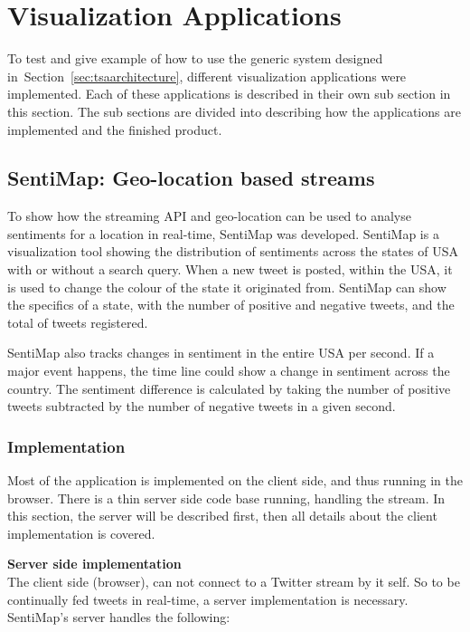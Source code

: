 \clearpage
\section{Visualization Applications}
\label{sec:visualization_applications}
To test and give example of how to use the generic system designed in~Section~\ref{sec:tsaarchitecture}, different visualization applications were implemented. Each of these applications is described in their own sub section in this section. The sub sections are divided into describing how the applications are implemented and the finished product.

\subsection{SentiMap: Geo-location based streams}

To show how the streaming API and geo-location can be used to analyse sentiments for a location in real-time, SentiMap was developed. SentiMap is a visualization tool showing the distribution of sentiments across the states of USA with or without a search query. When a new tweet is posted, within the USA, it is used to change the colour of the state it originated from. SentiMap can show the specifics of a state, with the number of positive and negative tweets, and the total of tweets registered.

SentiMap also tracks changes in sentiment in the entire USA per second. If a major event happens, the time line could show a change in sentiment across the country. The sentiment difference is calculated by taking the number of positive tweets subtracted by the number of negative tweets in a given second. 

\subsubsection{Implementation}

Most of the application is implemented on the client side, and thus running in the browser. There is a thin server side code base running, handling the stream. In this section, the server will be described first, then all details about the client implementation is covered. 


\textbf{Server side implementation} \\

The client side (browser), can not connect to a Twitter stream by it self. So to be continually fed tweets in real-time, a server implementation is necessary. SentiMap's server handles the following:

